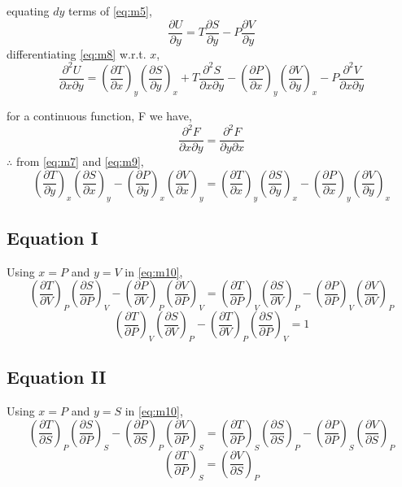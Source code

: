 \documentclass{article}
\numberwithin{equation}{section}
\begin{document}
equating $dy$ terms of \eqref{eq:m5},
\begin{equation}
  \frac{\partial U}{\partial y} = T\frac{\partial S}{\partial y} - P\frac{\partial V}{\partial y} \label{eq:m8}
\end{equation}
differentiating \eqref{eq:m8} w.r.t. $x$,
\begin{equation}
  \frac{\partial^2 U}{\partial x \partial y} = \left(\frac{\partial T}{\partial x}\right)_y \left(\frac{\partial S}{\partial y}\right)_x + T\frac{\partial^2 S}{\partial x \partial y} - \left(\frac{\partial P}{\partial x}\right)_y \left(\frac{\partial V}{\partial y}\right)_x - P\frac{\partial^2 V}{\partial x \partial y} \label{eq:m9}
\end{equation}

for a continuous function, F we have,
$$\frac{\partial^2 F}{\partial x \partial y}=\frac{\partial^2 F}{\partial y \partial x}$$
$\therefore$ from \eqref{eq:m7} and \eqref{eq:m9},
\begin{equation}
  \left(\frac{\partial T}{\partial y}\right)_x \left(\frac{\partial S}{\partial x}\right)_y - \left(\frac{\partial P}{\partial y}\right)_x \left(\frac{\partial V}{\partial x}\right)_y = \left(\frac{\partial T}{\partial x}\right)_y \left(\frac{\partial S}{\partial y}\right)_x - \left(\frac{\partial P}{\partial x}\right)_y \left(\frac{\partial V}{\partial y}\right)_x \label{eq:m10}
\end{equation}

\subsection{Equation I}
Using $x=P$ and $y=V$ in \eqref{eq:m10},
$$ \left(\frac{\partial T}{\partial V}\right)_P \left(\frac{\partial S}{\partial P}\right)_V - \left(\frac{\partial P}{\partial V}\right)_P \left(\frac{\partial V}{\partial P}\right)_V = \left(\frac{\partial T}{\partial P}\right)_V \left(\frac{\partial S}{\partial V}\right)_P - \left(\frac{\partial P}{\partial P}\right)_V \left(\frac{\partial V}{\partial V}\right)_P $$
$$\boxed{\left(\frac{\partial T}{\partial P}\right)_V \left(\frac{\partial S}{\partial V}\right)_P - \left(\frac{\partial T}{\partial V}\right)_P \left(\frac{\partial S}{\partial P}\right)_V = 1}$$

\subsection{Equation II}
Using $x=P$ and $y=S$ in \eqref{eq:m10},
$$ \left(\frac{\partial T}{\partial S}\right)_P \left(\frac{\partial S}{\partial P}\right)_S - \left(\frac{\partial P}{\partial S}\right)_P \left(\frac{\partial V}{\partial P}\right)_S = \left(\frac{\partial T}{\partial P}\right)_S \left(\frac{\partial S}{\partial S}\right)_P - \left(\frac{\partial P}{\partial P}\right)_S \left(\frac{\partial V}{\partial S}\right)_P$$
$$\boxed{\left(\frac{\partial T}{\partial P}\right)_S = \left(\frac{\partial V}{\partial S}\right)_P}$$
\end{document}
